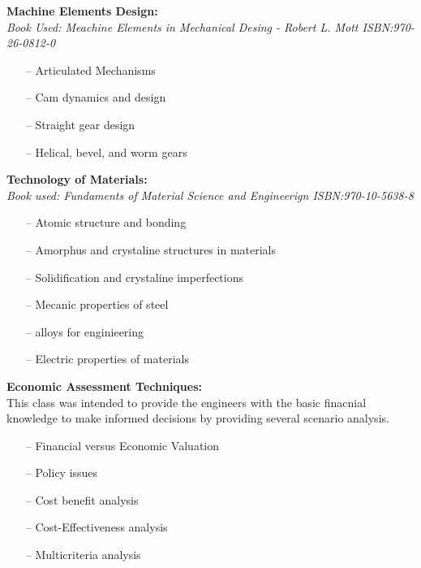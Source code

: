 \documentclass{article}
\begin{document}
\textbf{Machine Elements Design:}\\
    \emph{Book Used: Meachine Elements in Mechanical Desing - Robert L. Mott ISBN:970-26-0812-0}
    \begin{itemize}
     \setlength\itemsep{0pt}
      \item[--] Articulated Mechanisms
      \item[--] Cam dynamics and design
      \item[--] Straight gear design
      \item[--] Helical, bevel, and worm gears
    \end{itemize}


\textbf{Technology of Materials:}\\
    \emph{Book used: Fundaments of Material Science and Engineerign  ISBN:970-10-5638-8}
    \begin{itemize}
     \setlength\itemsep{0pt}
        \item[--] Atomic structure and bonding
        \item[--] Amorphus and crystaline structures in materials
        \item[--] Solidification and crystaline imperfections
        \item[--] Mecanic properties of steel
        \item[--] alloys for enginieering
        \item[--] Electric properties of materials
    \end{itemize}


\textbf{Economic Assessment Techniques:}\\
    This class was intended to provide the engineers with the basic finacnial knowledge to
    make informed decisions by providing several scenario analysis.
    \begin{itemize}
     \setlength\itemsep{0pt}
        \item[--] Financial versus Economic Valuation
        \item[--] Policy issues
        \item[--] Cost benefit analysis
        \item[--] Cost-Effectiveness analysis
        \item[--] Multicriteria analysis
    \end{itemize}
\end{document}
